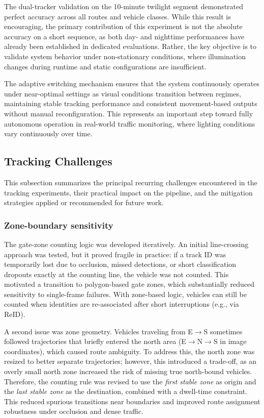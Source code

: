 The dual-tracker validation on the 10-minute twilight segment demonstrated perfect accuracy across all routes and vehicle classes. While this result is encouraging, the primary contribution of this experiment is not the absolute accuracy on a short sequence, as both day- and nighttime performances have already been established in dedicated evaluations. Rather, the key objective is to validate system behavior under non-stationary conditions, where illumination changes during runtime and static configurations are insufficient.

The adaptive switching mechanism ensures that the system continuously operates under near-optimal settings as visual conditions transition between regimes, maintaining stable tracking performance and consistent movement-based outputs without manual reconfiguration. This represents an important step toward fully autonomous operation in real-world traffic monitoring, where lighting conditions vary continuously over time.

\subsection{Tracking Challenges}

This subsection summarizes the principal recurring challenges encountered in the tracking experiments, their practical impact on the pipeline, and the mitigation strategies applied or recommended for future work.

\subsubsection{Zone-boundary sensitivity}

The gate-zone counting logic was developed iteratively. An initial line-crossing approach was tested, but it proved fragile in practice: if a track ID was temporarily lost due to occlusion, missed detections, or short classification dropouts exactly at the counting line, the vehicle was not counted. This motivated a transition to polygon-based gate zones, which substantially reduced sensitivity to single-frame failures. With zone-based logic, vehicles can still be counted when identities are re-associated after short interruptions (e.g., via ReID).

A second issue was zone geometry. Vehicles traveling from E$\to$S sometimes followed trajectories that briefly entered the north area (E$\to$N$\to$S in image coordinates), which caused route ambiguity. To address this, the north zone was resized to better separate trajectories; however, this introduced a trade-off, as an overly small north zone increased the risk of missing true north-bound vehicles. Therefore, the counting rule was revised to use the \emph{first stable zone} as origin and the \emph{last stable zone} as the destination, combined with a dwell-time constraint. This reduced spurious transitions near boundaries and improved route assignment robustness under occlusion and dense traffic.

